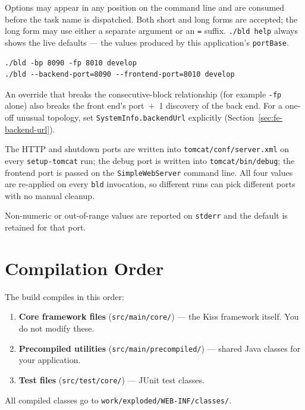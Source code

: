 \noindent
Options may appear in any position on the command line and are consumed before the task name is dispatched.  Both short and long forms are accepted; the long form may use either a separate argument or an \texttt{=} suffix.  \texttt{./bld help} always shows the live defaults --- the values produced by this application's \texttt{portBase}.

\begin{lstlisting}[style=shell]
./bld -bp 8090 -fp 8010 develop
./bld --backend-port=8090 --frontend-port=8010 develop
\end{lstlisting}

\begin{warnbox}
An override that breaks the consecutive-block relationship (for example \texttt{-fp} alone) also breaks the front end's port~$+$~1 discovery of the back end.  For a one-off unusual topology, set \texttt{SystemInfo.backendUrl} explicitly (Section~\ref{sec:fe-backend-url}).
\end{warnbox}

\noindent
The HTTP and shutdown ports are written into \texttt{tomcat/conf/server.xml} on every \texttt{setup-tomcat} run; the debug port is written into \texttt{tomcat/bin/debug}; the frontend port is passed on the \texttt{SimpleWebServer} command line.  All four values are re-applied on every \texttt{bld} invocation, so different runs can pick different ports with no manual cleanup.

Non-numeric or out-of-range values are reported on \texttt{stderr} and the default is retained for that port.

\section{Compilation Order}
\label{sec:build-order}

The build compiles in this order:

\begin{enumerate}
  \item \textbf{Core framework files} (\texttt{src/main/core/}) --- the Kiss framework itself.  You do not modify these.
  \item \textbf{Precompiled utilities} (\texttt{src/main/precompiled/}) --- shared Java classes for your application.
  \item \textbf{Test files} (\texttt{src/test/core/}) --- JUnit test classes.
\end{enumerate}

\noindent
All compiled classes go to \texttt{work/exploded/WEB-INF/classes/}.

